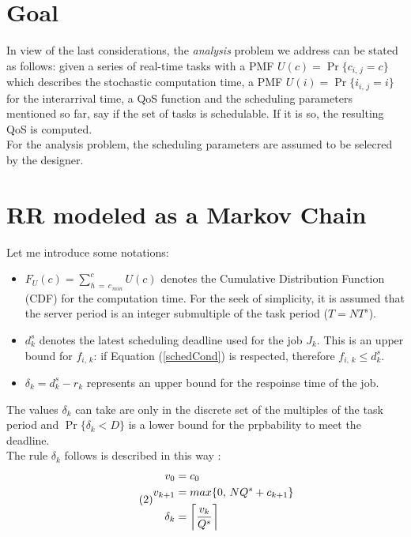 \section{Goal}
In view of the last considerations, the \emph{analysis} problem we address can be stated as follows: given a series of real-time tasks with a PMF \( U(c) = \Pr\{c_{i,\,j} = c\} \) which describes the stochastic computation time, a PMF \( U(i) = \Pr\{i_{i,\,j} = i\} \) for the interarrival time, a QoS function and the scheduling parameters mentioned so far, say if the set of tasks is schedulable. If it is so, the resulting QoS is computed.\\
For the analysis problem, the scheduling parameters are assumed to be selecred by the designer.

\section{RR modeled as a Markov Chain}
Let me introduce some notations:
\begin{itemize}
  \item \( F_{U}(c) = \displaystyle\sum_{h\,=\,c_{\,min}}^{c} U(c) \) denotes the Cumulative Distribution Function (CDF) for the computation time. For the seek of simplicity, it is assumed that the server period is an integer submultiple of the task period (\( T = NT^{s} \)).
  \item \( d_{k}^{s} \) denotes the latest scheduling deadline used for the job \( J_{k} \). This is an upper bound for \( f_{i,\,k} \): if Equation (\ref{schedCond}) is respected, therefore \( f_{i,\,k} \leq d_{k}^{s} \).
  \item \( \delta_{k} = d_{k}^{s} - r_{k} \) represents an upper bound for the respoinse time of the job.
\end{itemize}

The values \( \delta_{k} \) can take are only in the discrete set of the multiples of the task period and \( \Pr\{\delta_{k} < D\} \) is a lower bound for the prpbability to meet the deadline.\\
The rule \( \delta_{k} \) follows is described in this way \cite{probGuarantees} \cite{effRobustGuarantees}:
\begin{equation} \tag{2} \label{markovProcess}
\begin{split}
  v_{0} &= c_{0}\\
  v_{k+1} &= max\{0,\,NQ^{s} + c_{k+1}\}\\
  \delta_{k} &= \ceil[\bigg]{\frac{v_{k}}{Q^{s}}}
\end{split}
\end{equation}

